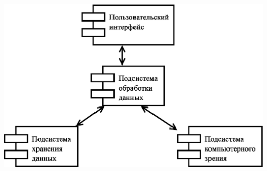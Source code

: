 \documentclass[russian,utf8,a1paper,nostitching,simple]{eskdgraph}
\begin{document}
\begin{ESKDdrawing}
\begin{minipage}{42cm}
    \vspace{4cm}
    \centering
     \\
    \vspace{2cm}
    \centering
    \includegraphics[height=25cm]{fig/design_main.eps}
  \end{minipage}
\end{ESKDdrawing}

\setcounter{page}{1}
\begin{ESKDdrawing}
\end{ESKDdrawing}
\end{document}
